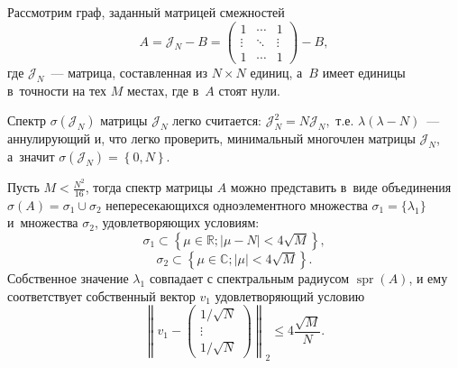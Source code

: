 Рассмотрим граф, заданный матрицей смежностей
\[ A = \mathcal{J}_N - B =
    \begin{pmatrix}1 & \cdots & 1\\ \vdots & \ddots & \vdots \\ 1 & \cdots & 1\end{pmatrix} - B, \]
 где \( \mathcal{J}_N \)~--- матрица, составленная из \( N{\times}N \) единиц,
 а~\( B \) имеет единицы в~точности на тех \( M \) местах,
 где в~\( A \) стоят нули.

Спектр \( \sigma\left( \mathcal{J}_N \right) \)
 матрицы \( \mathcal{J}_N \) легко считается:
 \( \mathcal{J}_N^2 = N \mathcal{J}_N, \) т.е.
 \( \lambda(\lambda - N) \)~--- аннулирующий и, что легко проверить,
 минимальный многочлен матрицы \( \mathcal{J}_N \), а~значит
 \( \sigma\left( \mathcal{J}_N \right) = \left\{ 0,N \right\}. \)

\begin{ksvthm}\label{kozlukovsv:thm:almost-all-ones}
    Пусть \( M < \frac{N^2}{16} \),
    тогда спектр матрицы \( A \) можно представить в~виде
    объединения \( \sigma\left(A\right) = \sigma_1 \cup \sigma_2 \)
    непересекающихся
    одноэлементного множества \( \sigma_1=\{\lambda_1\} \)
    и~множества \( \sigma_2 \), удовлетворяющих условиям:
    \[ \sigma_1 \subset \left\{ \mu\in\mathbb{R}; \lvert \mu - N \rvert < 4\sqrt{M} \right\}, \]
    \[ \sigma_2 \subset \left\{ \mu\in\mathbb{C}; \lvert \mu \rvert < 4\sqrt{M} \right\}. \]
    Собственное значение \( \lambda_1 \) совпадает с спектральным радиусом
    \( \operatorname{spr}(A) \),
    и ему соответствует собственный вектор \( v_1 \)
    удовлетворяющий условию
    \[ \left\|v_1 - 
    \begin{pmatrix} 1/\sqrt{N}\\ \vdots \\ 1/\sqrt{N}\end{pmatrix}\right\|_2
        \leq 4\frac{\sqrt{M}}{N}. \]
\end{ksvthm}
